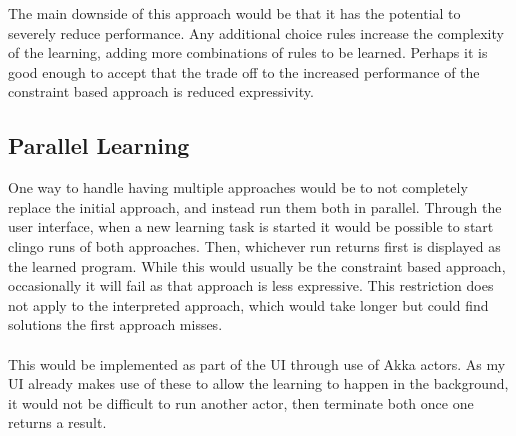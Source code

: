 The main downside of this approach would be that it has the potential to severely reduce performance. Any additional choice rules increase the complexity of the learning, adding more combinations of rules to be learned. Perhaps it is good enough to accept that the trade off to the increased performance of the constraint based approach is reduced expressivity. 

\subsection{Parallel Learning}
One way to handle having multiple approaches would be to not completely replace the initial approach, and instead run them both in parallel. Through the user interface, when a new learning task is started it would be possible to start clingo runs of both approaches. Then, whichever run returns first is displayed as the learned program. While this would usually be the constraint based approach, occasionally it will fail as that approach is less expressive. This restriction does not apply to the interpreted approach, which would take longer but could find solutions the first approach misses. \\ \\
This would be implemented as part of the UI through use of Akka actors. As my UI already makes use of these to allow the learning to happen in the background, it would not be difficult to run another actor, then terminate both once one returns a result.

\pagebreak
%
%